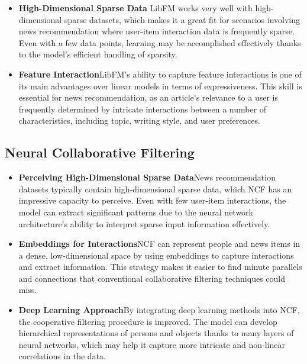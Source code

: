 \documentclass[9pt,twocolumn,twoside,lineno]{gsajnl}
\begin{document}
\begin{itemize}
    \item \textbf{High-Dimensional Sparse Data\newline}
    LibFM works very well with high-dimensional sparse datasets, which makes it a great fit for scenarios involving news recommendation where user-item interaction data is frequently sparse. Even with a few data points, learning may be accomplished effectively thanks to the model's efficient handling of sparsity.
    \item \textbf{Feature Interaction\newline}LibFM's ability to capture feature interactions is one of its main advantages over linear models in terms of expressiveness. This skill is essential for news recommendation, as an article's relevance to a user is frequently determined by intricate interactions between a number of characteristics, including topic, writing style, and user preferences.
\end{itemize}



\subsection{Neural Collaborative Filtering}

\begin{itemize}
    \item \textbf{Perceiving High-Dimensional Sparse Data\newline}News recommendation datasets typically contain high-dimensional sparse data, which NCF has an impressive capacity to perceive. Even with few user-item interactions, the model can extract significant patterns due to the neural network architecture's ability to interpret sparse input information effectively.
    \item \textbf{Embeddings for Interactions\newline}NCF can represent people and news items in a dense, low-dimensional space by using embeddings to capture interactions and extract information. This strategy makes it easier to find minute parallels and connections that conventional collaborative filtering techniques could miss.
    
    \item \textbf{Deep Learning Approach\newline}By integrating deep learning methods into NCF, the cooperative filtering procedure is improved. The model can develop hierarchical representations of persons and objects thanks to many layers of neural networks, which may help it capture more intricate and non-linear correlations in the data.
\end{itemize}
\end{document}
